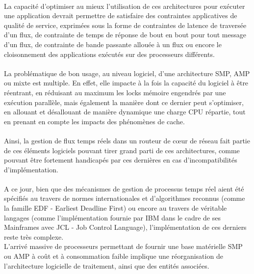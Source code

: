 \paragraph{}
La capacité d'optimiser au mieux l'utilisation de ces architectures pour exécuter une
application devrait permettre de satisfaire des contraintes applicatives de qualité de
service, exprimées sous la forme  de contraintes de latence de traversée d'un
flux, de contrainte de temps de réponse de bout en bout pour tout message d'un
flux, de contrainte de bande passante allouée à un flux ou encore le cloisonnement
des applications exécutés sur des processeurs différents.

\paragraph{}
La problématique de bon usage, au niveau logiciel, d'une architecture SMP, AMP
ou mixte est multiple. En effet, elle impacte à la fois la capacité du logiciel
à être réentrant, en réduisant au maximum les locks mémoire engendrés par une
exécution parallèle, mais également la manière dont ce dernier peut s'optimiser,
en allouant et désallouant de manière dynamique une charge CPU répartie, tout en
prenant en compte les impacts des phénomènes de cache.

\paragraph{}
Ainsi, la gestion de flux temps réels dans un routeur de c\oe ur de réseau fait partie
de ces éléments logiciels pouvant tirer grand parti de ces architectures, comme pouvant
être fortement handicapés par ces dernières en cas d'incompatibilités d'implémentation.
\paragraph{}
A ce jour, bien que des mécanismes de gestion de processus temps réel aient été spécifiés au
travers de normes internationales et d'algorithmes reconnus (comme la famille EDF - Earliest Deadline First) ou
encore au travers de véritable langages (comme l'implémentation fournie par IBM dans le cadre
de ses Mainframes avec JCL - Job Control Language), l'implémentation de ces derniers reste
très complexe.\\

L'arrivé massive de processeurs permettant de fournir une base matérielle SMP ou AMP
à coût et à consommation faible implique une réorganisation de l'architecture logicielle
de traitement, ainsi que des entités associées.
